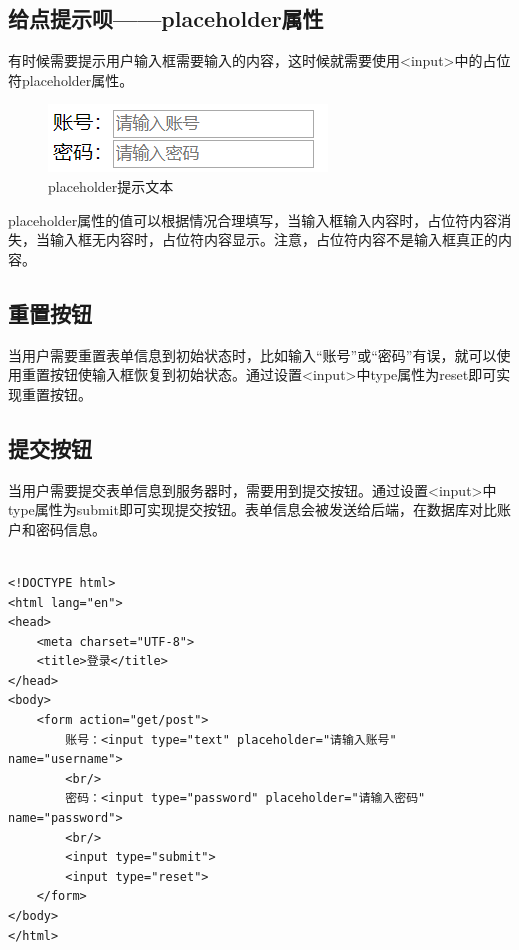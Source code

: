 \vspace{0.5cm}

\subsection{给点提示呗——placeholder属性}

有时候需要提示用户输入框需要输入的内容，这时候就需要使用<input>中的占位符placeholder属性。

\begin{figure}[H]
	\centering
	\includegraphics[]{img/C4/4-3/1.png}
	\caption{placeholder提示文本}
\end{figure}

placeholder属性的值可以根据情况合理填写，当输入框输入内容时，占位符内容消失，当输入框无内容时，占位符内容显示。注意，占位符内容不是输入框真正的内容。\\

\subsection{重置按钮}

当用户需要重置表单信息到初始状态时，比如输入“账号”或“密码”有误，就可以使用重置按钮使输入框恢复到初始状态。通过设置<input>中type属性为reset即可实现重置按钮。\\

\subsection{提交按钮}

当用户需要提交表单信息到服务器时，需要用到提交按钮。通过设置<input>中type属性为submit即可实现提交按钮。表单信息会被发送给后端，在数据库对比账户和密码信息。\\

\\

\begin{lstlisting}[style=htmlcssjs]
<!DOCTYPE html>
<html lang="en">
<head>
    <meta charset="UTF-8">
    <title>登录</title>
</head>
<body>
    <form action="get/post">
        账号：<input type="text" placeholder="请输入账号" name="username">
        <br/>
        密码：<input type="password" placeholder="请输入密码" name="password">
        <br/>
        <input type="submit">
        <input type="reset">
    </form>
</body>
</html>
\end{lstlisting}

